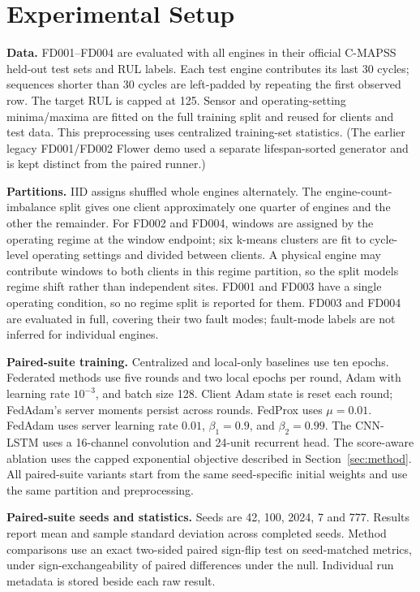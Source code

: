 \section{Experimental Setup}
\label{sec:setup}

\textbf{Data.} FD001--FD004 are evaluated with all engines in their official C-MAPSS held-out test sets and RUL labels. Each test engine contributes its last 30 cycles; sequences shorter than 30 cycles are left-padded by repeating the first observed row. The target RUL is capped at 125. Sensor and operating-setting minima/maxima are fitted on the full training split and reused for clients and test data. This preprocessing uses centralized training-set statistics. (The earlier legacy FD001/FD002 Flower demo used a separate lifespan-sorted generator and is kept distinct from the paired runner.)

\textbf{Partitions.} IID assigns shuffled whole engines alternately. The engine-count-imbalance split gives one client approximately one quarter of engines and the other the remainder. For FD002 and FD004, windows are assigned by the operating regime at the window endpoint; six k-means clusters are fit to cycle-level operating settings and divided between clients. A physical engine may contribute windows to both clients in this regime partition, so the split models regime shift rather than independent sites. FD001 and FD003 have a single operating condition, so no regime split is reported for them. FD003 and FD004 are evaluated in full, covering their two fault modes; fault-mode labels are not inferred for individual engines.

\textbf{Paired-suite training.} Centralized and local-only baselines use ten epochs. Federated methods use five rounds and two local epochs per round, Adam with learning rate $10^{-3}$, and batch size 128. Client Adam state is reset each round; FedAdam's server moments persist across rounds. FedProx uses $\mu=0.01$. FedAdam uses server learning rate $0.01$, $\beta_1=0.9$, and $\beta_2=0.99$. The CNN-LSTM uses a 16-channel convolution and 24-unit recurrent head. The score-aware ablation uses the capped exponential objective described in Section~\ref{sec:method}. All paired-suite variants start from the same seed-specific initial weights and use the same partition and preprocessing.

\textbf{Paired-suite seeds and statistics.} Seeds are 42, 100, 2024, 7 and 777. Results report mean and sample standard deviation across completed seeds. Method comparisons use an exact two-sided paired sign-flip test on seed-matched metrics, under sign-exchangeability of paired differences under the null. Individual run metadata is stored beside each raw result.

